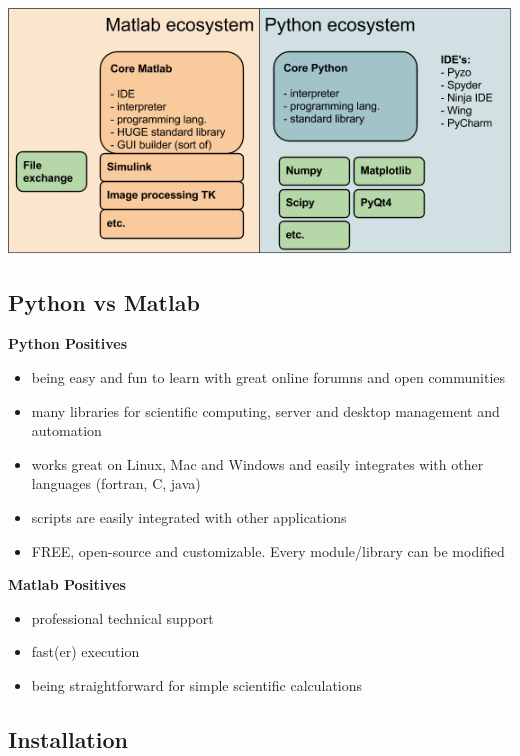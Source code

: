 \documentclass[%
oneside,                 %
final,                   %
10pt]{article}
\begin{document}
\centerline{\includegraphics[width=1.0\linewidth]{fig/pythonvsmatlab.png}}




\subsection{Python vs Matlab}

\textbf{Python Positives}
\begin{itemize}
\item being easy and fun to learn with great online forumns and open communities

\item many libraries for scientific computing, server and desktop management and automation

\item works great on Linux, Mac and Windows and easily integrates with other languages (fortran, C, java)

\item scripts are easily integrated with other applications

\item FREE, open-source and customizable. Every module/library can be modified
\end{itemize}

\noindent
\textbf{Matlab Positives}
\begin{itemize}
\item professional technical support

\item fast(er) execution

\item being straightforward for simple scientific calculations
\end{itemize}

\noindent
\subsection{Installation}
\end{document}
